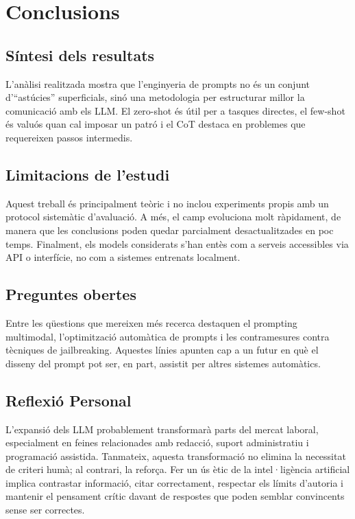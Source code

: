 \documentclass[12pt,a4paper]{report}
\begin{document}
\chapter{Conclusions}

\section{Síntesi dels resultats}
L'anàlisi realitzada mostra que l'enginyeria de prompts no és un conjunt d'``astúcies'' superficials, sinó una metodologia per estructurar millor la comunicació amb els LLM. El zero-shot és útil per a tasques directes, el few-shot és valuós quan cal imposar un patró i el CoT destaca en problemes que requereixen passos intermedis.

\section{Limitacions de l'estudi}
Aquest treball és principalment teòric i no inclou experiments propis amb un protocol sistemàtic d'avaluació. A més, el camp evoluciona molt ràpidament, de manera que les conclusions poden quedar parcialment desactualitzades en poc temps. Finalment, els models considerats s'han entès com a serveis accessibles via API o interfície, no com a sistemes entrenats localment.

\section{Preguntes obertes}
Entre les qüestions que mereixen més recerca destaquen el prompting multimodal, l'optimització automàtica de prompts i les contramesures contra tècniques de jailbreaking. Aquestes línies apunten cap a un futur en què el disseny del prompt pot ser, en part, assistit per altres sistemes automàtics.

\section{Reflexió Personal}
L'expansió dels LLM probablement transformarà parts del mercat laboral, especialment en feines relacionades amb redacció, suport administratiu i programació assistida. Tanmateix, aquesta transformació no elimina la necessitat de criteri humà; al contrari, la reforça. Fer un ús ètic de la intel·ligència artificial implica contrastar informació, citar correctament, respectar els límits d'autoria i mantenir el pensament crític davant de respostes que poden semblar convincents sense ser correctes.
\end{document}
